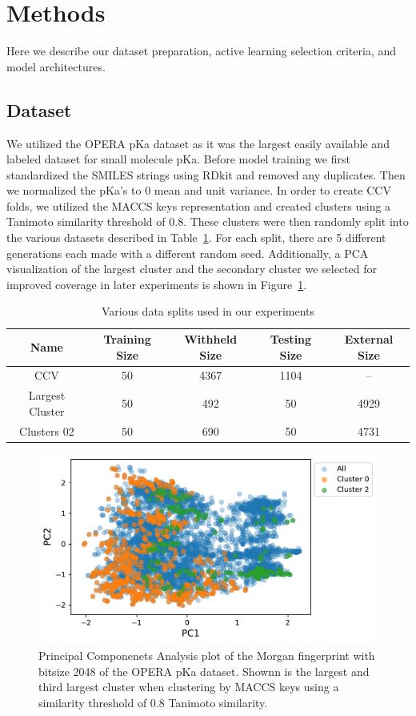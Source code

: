 \documentclass[journal=jmcmar,manuscript=article]{achemso}
\begin{document}
\section{Methods}
Here we describe our dataset preparation, active learning selection criteria, and model architectures.

\subsection{Dataset}
We utilized the OPERA pKa dataset\cite{operapKa} as it was the largest easily available and labeled dataset for small molecule pKa. Before model training we first standardized the SMILES\cite{smiles} strings using RDkit\cite{rdkit} and removed any duplicates. Then we normalized the pKa's to 0 mean and unit variance. In order to create CCV folds, we utilized the MACCS keys \cite{maccskeys} representation and created clusters using a Tanimoto similarity threshold of 0.8. These clusters were then randomly split into the various datasets described in Table~\ref{tab:datasets}. For each split, there are 5 different generations each made with a different random seed. Additionally, a PCA visualization of the largest cluster and the secondary cluster we selected for improved coverage in later experiments is shown in Figure~\ref{fig:pcaclusters}.

\begin{table}[]
    \centering
    \begin{tabular}{c|c|c|c|c}
    \hline
        Name & Training Size & Withheld Size & Testing Size & External Size \\
    \hline
        CCV & 50 & 4367 & 1104 & -- \\
        Largest Cluster & 50 & 492 & 50 & 4929 \\
        Clusters 02 & 50 & 690 & 50 & 4731 \\
    \hline
    \end{tabular}
    \caption{Various data splits used in our experiments}
    \label{tab:datasets}
\end{table}

\begin{figure}[tbph]
    \centering
    \includegraphics[width=.6\linewidth]{figures/fig1_pca.pdf}
    \caption{Principal Componenets Analysis plot of the Morgan fingerprint with bitsize 2048 of the OPERA pKa dataset. Shownn is the largest and third largest cluster when clustering by MACCS keys using a similarity threshold of 0.8 Tanimoto similarity.}
    \label{fig:pcaclusters}
\end{figure}
\end{document}
